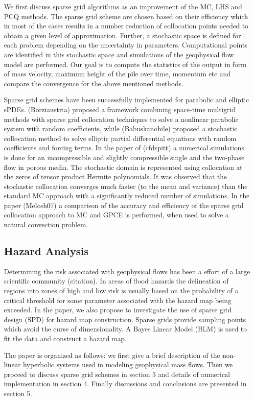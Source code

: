 \documentclass{article}
\begin{document}
We first discuss sparse grid algorithms as an improvement of the MC, LHS and PCQ methods. 
The sparse grid scheme are chosen based on their efficiency which in most of the cases
results in a number reduction of collocation points needed to obtain a given level of approximation. 
Further, a stochastic space is defined for each problem depending on the uncertainty in
parameters. Computational points are identified in this stochastic space and simulations 
of the geophysical flow model are performed. Our goal is to compute the statistics of the 
output in form of mass velocity, maximum height of the pile over time, momentum etc and
compare the convergence for the above mentioned methods. 
 

Sparse grid schemes have been successfully implemented for parabolic and elliptic sPDEs.
(Borziaustria) proposed a framework combining space-time multigrid methods with sparse grid
collocation techniques to solve a nonlinear parabolic system with random coefficients, while
(Babuskanobile) proposed a stochastic collocation method to solve elliptic partial differential
equations with random coefficients and forcing terms. In the paper of (cfdspitt) a numerical 
simulations is done for an incompressible and slightly compressible single and the two-phase 
flow in porous media. The stochastic domain is represented using collocation at the zeros of 
tensor product Hermite polynomials. It was observed that the stochastic collocation converges
much faster (to the mean and variance) than the standard MC approach with a significantly 
reduced number of simulations. In the paper (Melosh07) a comparison of the accuracy and 
efficiency of the sparse grid collocation approach to MC and GPCE is performed, when used 
to solve a natural convection problem.

\subsection{Hazard Analysis} Determining the risk associated with geophysical flows has been a effort of a large scientific
community (citation). In areas of flood hazards the delineation of  regions into zones of high and low risk
is usually based on the probability of a critical threshold for some parameter associated with 
the hazard map being exceeded.
In the paper, we also propose to investigate the use of sparse grid design (SPD) for hazard 
map construction. Sparse grids provide sampling points which avoid the curse of dimensionality.
A Bayes Linear Model (BLM) is used to fit the data and construct a hazard map. 


The paper is organized as follows: we first give a brief description of the non-linear hyperbolic systems
used in modeling geophysical mass flows. Then we proceed to discuss sparse grid schemes 
in section 3 and details of numerical implementation in section 4. Finally discussions and conclusions
are presented in section 5.
\end{document}
